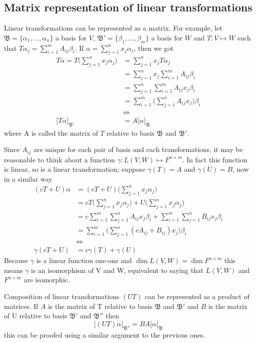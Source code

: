 \documentclass[../main.tex]{subfiles}
\begin{document}
\subsection{Matrix representation of linear transformations}
Linear transformations can be represented as a matrix. For example, let $\mathfrak{B}=\{\alpha_1,\dots,\alpha_n\}$ a basis for $V$, $\mathfrak{B}'=\{\beta_1,\dots,\beta_m\}$ a basis for $W$ and $T:V\mapsto W$ such that $T\alpha_j=\sum_{i=1}^m A_{ij}\beta_i$. If $\alpha=\sum_{j=1}^n x_j\alpha_j$, then we got
\begin{align*}
    T\alpha = T\Big(\sum_{j=1}^n x_j \alpha_j\Big)
    &=\sum_{j=1}^n x_j T\alpha_j\\
    &=\sum_{j=1}^n x_j \sum_{i=1}^m A_{ij}\beta_i\\
    &=\sum_{j=1}^n \sum_{i=1}^m A_{ij}x_j\beta_i\\
    &=\sum_{i=1}^m \Big(\sum_{j=1}^n A_{ij}x_j\Big)\beta_i\\
    &\Longleftrightarrow\\
    \big[T\alpha\big]_\mathfrak{B'}&=
    A\big[\alpha\big]_\mathfrak{B}
\end{align*}
where A is called the matrix of $T$ relative to basis $\mathfrak{B}$ and $\mathfrak{B'}$. 

Since $A_{ij}$ are unique for each pair of basis and each transformations, it may be reasonable to think about a function $\gamma:L(V,W)\mapsto F^{n\times m}$. In fact this function is linear, so is a linear transformation; suppose $\gamma(T) = A$ and $\gamma(U) = B$, now in a similar way
\begin{align*}
    (cT+U)\alpha &= (cT+U)\Big(\sum_{j=1}^n x_j \alpha_j\Big)\\
    &=cT\Big(\sum_{j=1}^n x_j \alpha_j\Big) + U\Big(\sum_{j=1}^n x_j \alpha_j\Big)\\
    &=c\sum_{i=1}^m\sum_{j=1}^n A_{ij}x_j\beta_i + \sum_{i=1}^m \sum_{j=1}^n B_{ij}x_j\beta_i\\
    &=\sum_{i=1}^m\Big(\sum_{j=1}^n (cA_{ij} + B_{ij})x_j\Big)\beta_i\\
    &\Longleftrightarrow\\
    \gamma(cT+U)&=c\gamma(T)+\gamma(U)
\end{align*}
Because $\gamma$ is a linear function one-one and $\dim L(V,W) = \dim F^{n\times m}$ this means $\gamma$ is an isomorphism of V and W, equivalent to saying that $L(V,W)$ and $F^{n\times m}$ are isomorphic.

Composition of linear transformations $(UT)$ can be represented as a product of matrices. If $A$ is the matrix of T relative to basis $\mathfrak{B}$ and $\mathfrak{B'}$ and $B$ is the matrix of U relative to basis $\mathfrak{B'}$ and $\mathfrak{B''}$ then
\begin{equation*}
    \big[(UT)\alpha\big]_\mathfrak{B''}=
    BA\big[\alpha\big]_\mathfrak{B}
\end{equation*}
this can be proofed using a similar argument to the previous ones.
\end{document}
